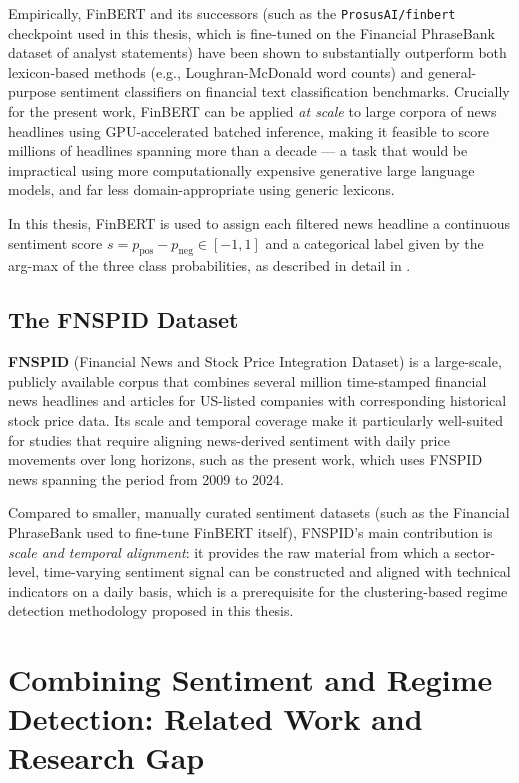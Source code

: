 Empirically, FinBERT and its successors (such as the
\texttt{ProsusAI/finbert} checkpoint used in this thesis, which is
fine-tuned on the Financial PhraseBank dataset of analyst statements) have
been shown to substantially outperform both lexicon-based methods (e.g.,
Loughran-McDonald word counts) and general-purpose sentiment classifiers
on financial text classification benchmarks. Crucially for the present
work, FinBERT can be applied \emph{at scale} to large corpora of news
headlines using GPU-accelerated batched inference, making it feasible to
score millions of headlines spanning more than a decade --- a task that
would be impractical using more computationally expensive
generative large language models, and far less domain-appropriate using
generic lexicons.

In this thesis, FinBERT is used to assign each filtered news headline a
continuous sentiment score $s = p_{\text{pos}} - p_{\text{neg}} \in
[-1, 1]$ and a categorical label given by the arg-max of the three class
probabilities, as described in detail in .

\subsection{The FNSPID Dataset}
\label{sec:soa-fnspid}

\textbf{FNSPID} (Financial News and Stock Price Integration Dataset)
\cite{zhang2023fnspid} is a large-scale, publicly available corpus that
combines several million time-stamped financial news headlines and
articles for US-listed companies with corresponding historical stock
price data. Its scale and temporal coverage make it particularly
well-suited for studies that require aligning news-derived sentiment with
daily price movements over long horizons, such as the present work, which
uses FNSPID news spanning the period from 2009 to 2024.

Compared to smaller, manually curated sentiment datasets (such as the
Financial PhraseBank used to fine-tune FinBERT itself), FNSPID's main
contribution is \emph{scale and temporal alignment}: it provides the raw
material from which a sector-level, time-varying sentiment signal can be
constructed and aligned with technical indicators on a daily basis, which
is a prerequisite for the clustering-based regime detection methodology
proposed in this thesis.

\section{Combining Sentiment and Regime Detection: Related Work and Research Gap}
\label{sec:soa-gap}

